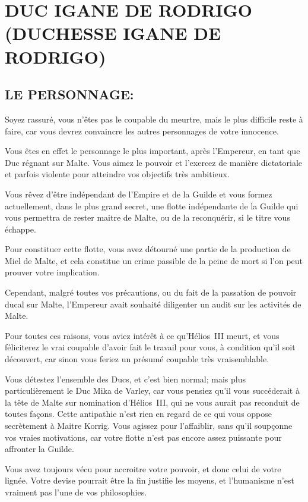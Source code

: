\documentclass[14pt,twocolumn]{extarticle}
\begin{document}
\section{DUC IGANE DE RODRIGO\\(DUCHESSE IGANE DE RODRIGO)}

\subsection{LE PERSONNAGE:}

Soyez rassuré, vous n'êtes pas le coupable du meurtre, mais le plus difficile
reste à faire, car vous devrez convaincre les autres personnages de votre
innocence.

Vous êtes en effet le personnage le plus important, après l'Empereur, en tant
que Duc régnant sur Malte. Vous aimez le pouvoir et l'exercez de manière
dictatoriale et parfois violente pour atteindre vos objectifs très ambitieux.

Vous rêvez d'être indépendant de l'Empire et de la Guilde et vous formez
actuellement, dans le plus grand secret, une flotte indépendante de la Guilde
qui vous permettra de rester maitre de Malte, ou de la reconquérir, si le titre
vous échappe.

Pour constituer cette flotte, vous avez détourné une partie de la production de
Miel de Malte, et cela constitue un crime passible de la peine de mort si l'on
peut prouver votre implication.

Cependant, malgré toutes vos précautions, ou du fait de la passation de pouvoir
ducal sur Malte, l'Empereur avait souhaité diligenter un audit sur les
activités de Malte.

Pour toutes ces raisons, vous aviez intérêt à ce qu'Hélios~III meurt, et vous
féliciterez le vrai coupable d'avoir fait le travail pour vous, à condition
qu'il soit découvert, car sinon vous feriez un présumé coupable très
vraisemblable.

Vous détestez l'ensemble des Ducs, et c'est bien normal; mais plus
particulièrement le Duc Mika de Varley, car vous pensiez qu'il vous succéderait
à la tête de Malte sur nomination d'Hélios~III, qui ne vous aurait pas
reconduit de toutes façons. Cette antipathie n'est rien en regard de ce qui
vous oppose secrètement à Maitre Korrig. Vous agissez pour l'affaiblir, sans
qu'il soupçonne vos vraies motivations, car votre flotte n'est pas encore assez
puissante pour affronter la Guilde.

Vous avez toujours vécu pour accroitre votre pouvoir, et donc celui de votre
lignée. Votre devise pourrait être \og la fin justifie les moyens\fg{}, et
l'humanisme n'est vraiment pas l'une de vos philosophies.
\end{document}
